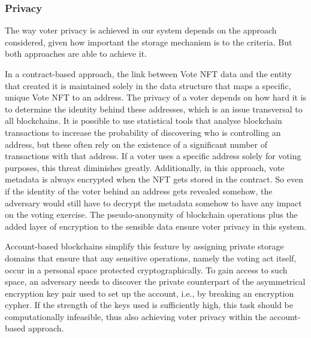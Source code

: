 \documentclass[../main.tex]{subfiles}
\begin{document}
        \subsubsection{Privacy}
        \label{voter_privacy}
            The way voter privacy is achieved in our system depends on the approach considered, given how important the storage mechanism is to the criteria. But both approaches are able to achieve it.
            \par
            In a contract-based approach, the link between Vote NFT data and the entity that created it is maintained solely in the data structure that maps a specific, unique Vote NFT to an address. The privacy of a voter depends on how hard it is to determine the identity behind these addresses, which is an issue transversal to all blockchains. It is possible to use statistical tools that analyse blockchain transactions to increase the probability of discovering who is controlling an address, but these often rely on the existence of a significant number of transactions with that address. If a voter uses a specific address solely for voting purposes, this threat diminishes greatly. Additionally, in this approach, vote metadata is always encrypted when the NFT gets stored in the contract. So even if the identity of the voter behind an address gets revealed somehow, the adversary would still have to decrypt the metadata somehow to have any impact on the voting exercise. The pseudo-anonymity of blockchain operations plus the added layer of encryption to the sensible data ensure voter privacy in this system.
            \par
            Account-based blockchains simplify this feature by assigning private storage domains that ensure that any sensitive operations, namely the voting act itself, occur in a personal space protected cryptographically. To gain access to such space, an adversary needs to discover the private counterpart of the asymmetrical encryption key pair used to set up the account, i.e., by breaking an encryption cypher. If the strength of the keys used is sufficiently high, this task should be computationally infeasible, thus also achieving voter privacy within the account-based approach.
        
\end{document}
